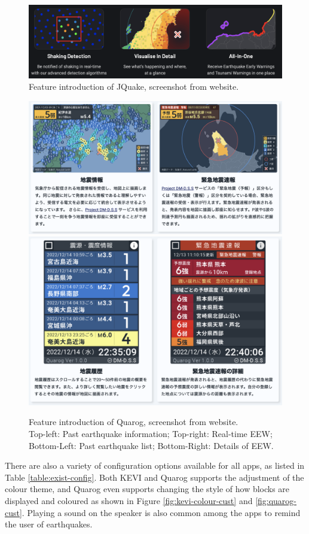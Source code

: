 \documentclass[10pt]{article}
\begin{document}
\begin{figure}[!ht]
    \centering

    \includegraphics[width=0.6\linewidth]{jquake-features.png}
    \caption[Feature introduction of JQuake]{Feature introduction of JQuake, screenshot from website.}
    \label{fig:jquake-monitor-features}
\end{figure}

\begin{figure}[!ht]
    \centering

    \includegraphics[width=0.6\linewidth]{quarog-features-1.png}\\
    \includegraphics[width=0.6\linewidth]{quarog-features-2.png}
    \caption[Feature introduction of Quarog]{Feature introduction of Quarog, screenshot from website.\\Top-left: Past earthquake information; Top-right: Real-time EEW;\\Bottom-Left: Past earthquake list; Bottom-Right: Details of EEW.}
    \label{fig:quarog-monitor-features}
\end{figure}

There are also a variety of configuration options available for all apps, as listed in Table \ref{table:exist-config}. Both KEVI and Quarog supports the adjustment of the colour theme, and Quarog even supports changing the style of how blocks are displayed and coloured as shown in Figure \ref{fig:kevi-colour-cust} and \ref{fig:quarog-cust}. Playing a sound on the speaker is also common among the apps to remind the user of earthquakes.
\end{document}
